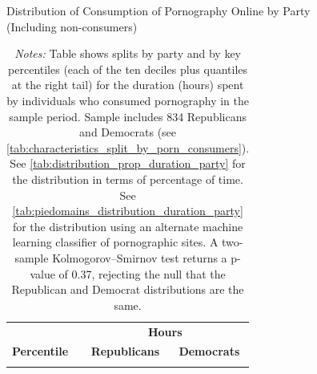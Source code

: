 \documentclass[12pt, letterpaper]{article}
\begin{document}
\begin{table}[ht] \centering \small \setlength\tabcolsep{10 pt}
	\caption{Distribution of Consumption of Pornography Online by Party\\ (Including non-consumers)}
	\label{tab:distribution_duration_party_untruncated}
	\begin{adjustbox}{max width=\textwidth}
		\begin{tabular}{crr}
			\toprule
			\multicolumn{1}{l}{\textbf{}}&\multicolumn{2}{c}{\textbf{Hours}}\\
			\cmidrule(l){2-3}
			\multicolumn{1}{l}{\textbf{Percentile}}&\multicolumn{1}{c}{\textbf{Republicans}}&\multicolumn{1}{c}{\textbf{Democrats}}\\
			\midrule
			\\
			\bottomrule
		\end{tabular}
	\end{adjustbox}
	\caption*{\footnotesize \emph{Notes:} 
		Table shows splits by party and by key percentiles (each of the ten deciles plus quantiles at the right tail) for the duration (hours) spent by individuals who consumed pornography in the sample period. 
		Sample includes 834 Republicans and Democrats (see \cref{tab:characteristics_split_by_porn_consumers}).
		See \cref{tab:distribution_prop_duration_party} for the distribution in terms of percentage of time. 
		See \cref{tab:piedomains_distribution_duration_party} for the distribution using an alternate machine learning classifier of pornographic sites. 
		A two-sample Kolmogorov–Smirnov test returns a p-value of 0.37, rejecting the null that the Republican and Democrat distributions are the same.
	}
\end{table}
\end{document}
